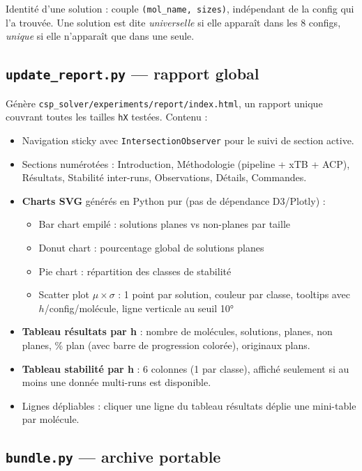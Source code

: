 Identité d'une solution : couple \texttt{(mol\_name, sizes)}, indépendant de la config qui
l'a trouvée. Une solution est dite \emph{universelle} si elle apparaît dans les 8 configs,
\emph{unique} si elle n'apparaît que dans une seule.

\subsection{\texttt{update\_report.py} — rapport global}

Génère \texttt{csp\_solver/experiments/report/index.html}, un rapport unique couvrant toutes
les tailles \texttt{hX} testées. Contenu :

\begin{itemize}
  \item Navigation sticky avec \texttt{IntersectionObserver} pour le suivi de section active.
  \item Sections numérotées : Introduction, Méthodologie (pipeline + xTB + ACP), Résultats,
    Stabilité inter-runs, Observations, Détails, Commandes.
  \item \textbf{Charts SVG} générés en Python pur (pas de dépendance D3/Plotly) :
    \begin{itemize}
      \item Bar chart empilé : solutions planes vs non-planes par taille
      \item Donut chart : pourcentage global de solutions planes
      \item Pie chart : répartition des classes de stabilité
      \item Scatter plot $\mu \times \sigma$ : 1 point par solution, couleur par classe,
        tooltips avec $h$/config/molécule, ligne verticale au seuil 10°
    \end{itemize}
  \item \textbf{Tableau résultats par h} : nombre de molécules, solutions, planes, non
    planes, \% plan (avec barre de progression colorée), originaux plans.
  \item \textbf{Tableau stabilité par h} : 6 colonnes (1 par classe), affiché seulement si
    au moins une donnée multi-runs est disponible.
  \item Lignes dépliables : cliquer une ligne du tableau résultats déplie une mini-table par
    molécule.
\end{itemize}

\subsection{\texttt{bundle.py} — archive portable}

